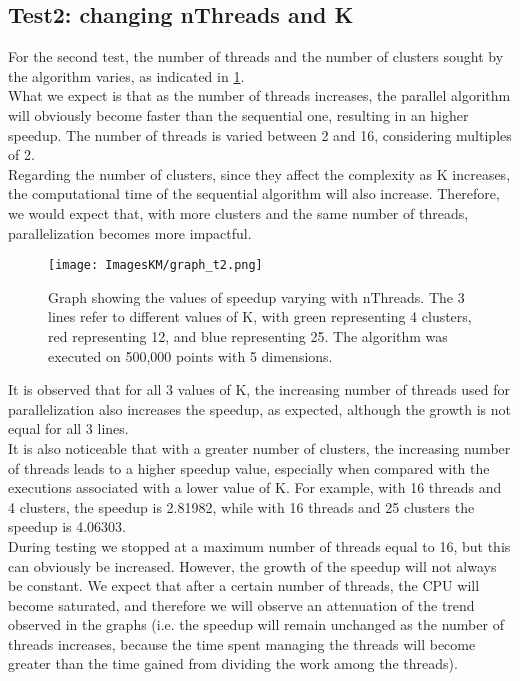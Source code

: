 \documentclass[10pt,twocolumn,letterpaper]{article}
\begin{document}
\subsection{Test2: changing nThreads and K}
\label{sec:t2}

For the second test, the number of threads and the number of clusters sought by the algorithm varies, as indicated in \cref{fig:t2}.\\
What we expect is that as the number of threads increases, the parallel algorithm will obviously become faster than the sequential one, resulting in an higher speedup. The number of threads is varied between 2 and 16, considering multiples of 2.\\
Regarding the number of clusters, since they affect the complexity as K increases, the computational time of the sequential algorithm will also increase. Therefore, we would expect that, with more clusters and the same number of threads, parallelization becomes more impactful.

\begin{figure}[h]
    \centering
    \texttt{[image: ImagesKM/graph\_t2.png]}
    \caption{Graph showing the values of speedup varying with nThreads. The 3 lines refer to different values of K, with green representing 4 clusters, red representing 12, and blue representing 25. The algorithm was executed on 500,000 points with 5 dimensions.}
    \label{fig:t2}
\end{figure}

It is observed that for all 3 values of K, the increasing number of threads used for parallelization also increases the speedup, as expected, although the growth is not equal for all 3 lines.\\
It is also noticeable that with a greater number of clusters, the increasing number of threads leads to a higher speedup value, especially when compared with the executions associated with a lower value of K. For example, with 16 threads and 4 clusters, the speedup is 2.81982, while with 16 threads and 25 clusters the speedup is 4.06303.\\
During testing we stopped at a maximum number of threads equal to 16, but this can obviously be increased. However, the growth of the speedup will not always be constant. We expect that after a certain number of threads, the CPU will become saturated, and therefore we will observe an attenuation of the trend observed in the graphs (i.e. the speedup will remain unchanged as the number of threads increases, because the time spent managing the threads will become greater than the time gained from dividing the work among the threads).\\
\end{document}
